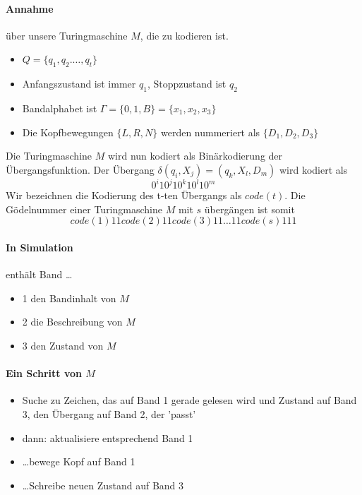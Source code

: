 \paragraph*{Annahme} über unsere Turingmaschine $M$, die zu kodieren ist.
\begin{itemize}
	\item $Q=\{q_1,q_2.\dots,q_t\}$
	\item Anfangszustand ist immer $q_1$, Stoppzustand ist $q_2$
	\item Bandalphabet ist $\Gamma=\{0,1,B\}=\{x_1,x_2,x_3\}$
	\item Die Kopfbewegungen $\{L,R,N\}$ werden nummeriert als $\{D_1,D_2,D_3\}$
\end{itemize}
Die Turingmaschine $M$ wird nun kodiert als Binärkodierung der Übergangsfunktion. Der Übergang $\delta(q_i,X_j)=(q_k,X_l,D_m)$ wird kodiert als $$0^i10^j10^k10^l10^m$$ Wir bezeichnen die Kodierung des t-ten Übergangs als $code(t)$. Die Gödelnummer einer Turingmaschine $M$ mit $s$ übergängen ist somit $$code(1)11code(2)11code(3)11 \dots 11code(s)111$$ %


\paragraph*{In Simulation} enthält Band \dots
\begin{itemize}
	\item 1 den Bandinhalt von $M$
	\item 2 die Beschreibung von $M$
	\item 3 den Zustand von $M$
\end{itemize}

\paragraph*{Ein Schritt von $M$}
\begin{itemize}
	\item Suche zu Zeichen, das auf Band 1 gerade gelesen wird und Zustand auf Band 3, den Übergang auf Band 2, der 'passt'
	\item dann: aktualisiere entsprechend Band 1
	\item \dots bewege Kopf auf Band 1
	\item \dots Schreibe neuen Zustand auf Band 3
\end{itemize}

